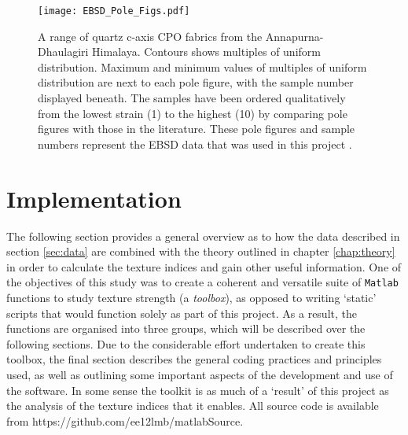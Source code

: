 \documentclass[a4paper,12pt]{report}
\numberwithin{equation}{chapter}
\begin{document}
\begin{figure}[h!]
  \centering
    \texttt{[image: EBSD\_Pole\_Figs.pdf]}
  \caption[EBSD data (pole figures)]{A range of quartz c-axis CPO fabrics from the Annapurna-Dhaulagiri Himalaya. Contours shows multiples of uniform distribution. Maximum and minimum values of multiples of uniform distribution are next to each pole figure, with the sample number displayed beneath. The samples have been ordered qualitatively from the lowest strain (1) to the highest (10) by comparing pole figures with those in the literature. These pole figures and sample numbers represent the EBSD data that was used in this project \citep[made available from][]{ParsonsThesis}.}
  \label{fig:EBSD_data}
\end{figure}  
    

\section{Implementation}

The following section provides a general overview as to how the data described in section \ref{sec:data} are combined with the theory outlined in chapter \ref{chap:theory} in order to calculate the texture indices and gain other useful information. One of the objectives of this study was to create a coherent and versatile suite of \texttt{Matlab} functions to study texture strength (a \emph{toolbox}), as opposed to writing \lq{}static\rq{} scripts that would function solely as part of this project. As a result, the functions are organised into three groups, which will be described over the following sections. Due to the considerable effort undertaken to create this toolbox, the final section describes the general coding practices and principles used, as well as outlining some important aspects of the development and use of the software. In some sense the toolkit is as much of a \lq{}result\rq{} of this project as the analysis of the texture indices that it enables. All source code is available from https://github.com/ee12lmb/matlabSource.                                                                                                     
\end{document}

